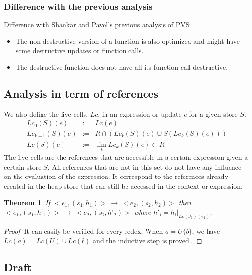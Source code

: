 \documentclass[12pt,a4paper]{article}
\newtheorem{theorem}{Theorem}
\newcommand{\ucont}[1]{\{#1\}}
\begin{document}
\subsubsection{Difference with the previous analysis}

Difference with Shankar \cite{shankar02} and Pavol's \cite{pavol} previous analysis of PVS:
\begin{itemize}
\item The non destructive version of a function is also optimized and might have some destructive updates or function calls.
\item The destructive function does not have all its function call destructive.
\end{itemize}





\subsection{Analysis in term of references}

We also define the live cells, $Lc$, in an expression or update $e$ for a given store $S$.
\begin{eqnarray*}
Lc_0(S)(e) &:=& Lv(e) \\
Lc_{k+1}(S)(e) &:=& R \cap (Lc_k(S)(e) \cup S( Lc_k(S)(e) ) ) \\
Lc(S)(e) &:=& \lim_k Lc_k(S)(e) \subset R
\end{eqnarray*}
The live cells are the references that are accessible in a certain expression given a certain store $S$. All references that are not in this set do not have any influence on the evaluation of the expression.
It correspond to the references already created in the heap store that can still be accessed in the context or expression.

\begin{theorem}
If $<e_1, (s_1, h_1)> \ \longrightarrow \ <e_2, (s_2, h_2)>$ then $<e_1, (s_1, h'_1)> \ \longrightarrow \ <e_2, (s_2, h'_2)>$ where $h'_i = h_i|_{Lc(S_1)(e_1)}$.
\end{theorem}
\begin{proof}
It can easily be verified for every redex. When $a = U\ucont{b}$, we have $Lc(a) = Lc(U) \cup Lc(b)$ and the inductive step is proved .
\end{proof}





\newpage
\subsection{Draft}
\end{document}
